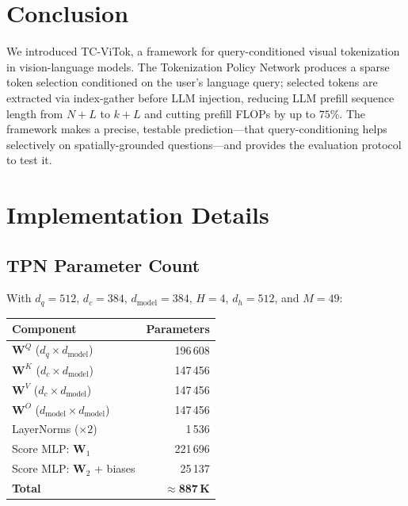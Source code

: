 \documentclass[11pt,a4paper]{article}
\begin{document}
\section{Conclusion}
\label{sec:conclusion}

We introduced TC-ViTok, a framework for query-conditioned visual
tokenization in vision-language models.
The Tokenization Policy Network produces a sparse token selection conditioned
on the user's language query; selected tokens are extracted via index-gather
before LLM injection, reducing LLM prefill sequence length from $N{+}L$ to
$k{+}L$ and cutting prefill FLOPs by up to $75\%$.
The framework makes a precise, testable prediction---that query-conditioning
helps selectively on spatially-grounded questions---and provides the
evaluation protocol to test it.

\appendix
\section{Implementation Details}
\label{app:implementation}

\subsection{TPN Parameter Count}

With $d_q{=}512$, $d_c{=}384$, $d_{\mathrm{model}}{=}384$, $H{=}4$,
$d_h{=}512$, and $M{=}49$:

\begin{center}
\small
\renewcommand{\arraystretch}{1.15}
\begin{tabular}{@{}lr@{}}
  \toprule
  Component & Parameters \\
  \midrule
  $\mathbf{W}^Q$ ($d_q \times d_{\mathrm{model}}$) & 196\,608 \\
  $\mathbf{W}^K$ ($d_c \times d_{\mathrm{model}}$) & 147\,456 \\
  $\mathbf{W}^V$ ($d_c \times d_{\mathrm{model}}$) & 147\,456 \\
  $\mathbf{W}^O$ ($d_{\mathrm{model}} \times d_{\mathrm{model}}$) & 147\,456 \\
  LayerNorms ($\times 2$) & 1\,536 \\
  Score MLP: $\mathbf{W}_1$ & 221\,696 \\
  Score MLP: $\mathbf{W}_2$ + biases & 25\,137 \\
  \midrule
  \textbf{Total} & \textbf{$\approx$887\,K} \\
  \bottomrule
\end{tabular}
\end{center}
\end{document}
